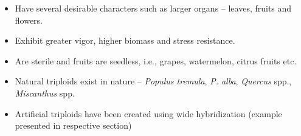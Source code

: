 \documentclass[
  ignorenonframetext,
  aspectratio=169]{beamer}
\providecommand{\tightlist}{%
  \setlength{\itemsep}{0pt}\setlength{\parskip}{0pt}}
\begin{document}
\begin{frame}{}
\begin{itemize}
\tightlist
\item
  Have several desirable characters such as larger organs -- leaves,
  fruits and flowers.
\item
  Exhibit greater vigor, higher biomass and stress resistance.
\item
  Are sterile and fruits are seedless, i.e., grapes, watermelon, citrus
  fruits etc.
\item
  Natural triploids exist in nature -- \emph{Populus tremula}, \emph{P.
  alba}, \emph{Quercus} spp., \emph{Miscanthus} spp.
\item
  Artificial triploids have been created using wide hybridization
  (example presented in respective section)
\end{itemize}
\end{frame}

\hypertarget{section-4}{%
\subsection{}\label{section-4}}
\end{document}
